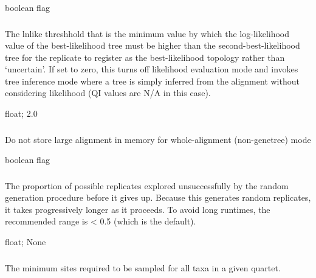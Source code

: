 \documentclass[letterpaper,12pt,english]{sphinxmanual}
\begin{document}
 boolean flag


\subsubsection{}
\label{\detokenize{prog_desc:lnlike-lnlike-thresh}}
 The lnlike threshhold that is the minimum value by which the log-likelihood value of the best-likelihood tree must be higher than the second-best-likelihood tree for the replicate to register as the best-likelihood topology rather than ‘uncertain’. If set to zero, this turns off likelihood evaluation mode and invokes tree inference mode where a tree is simply inferred from the alignment without considering likelihood (QI values are N/A in this case).

 float;  2.0


\subsubsection{}
\label{\detokenize{prog_desc:low-mem}}
 Do not store large alignment in memory for whole-alignment (non-genetree) mode

 boolean flag


\subsubsection{}
\label{\detokenize{prog_desc:max-random-sample-proportion}}
 The proportion of possible replicates explored unsuccessfully by the random generation procedure before it gives up. Because this generates random replicates, it takes progressively longer as it proceeds. To avoid long runtimes, the recommended range is \textless{} 0.5 (which is the default).

 float;  None


\subsubsection{}
\label{\detokenize{prog_desc:min-overlap}}
 The minimum sites required to be sampled for all taxa in a given quartet.
\end{document}
